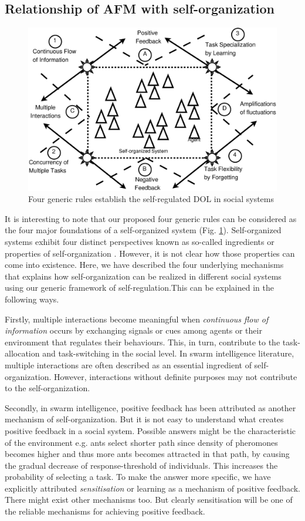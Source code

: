 \documentclass[final,5p,times,twocolumn]{elsarticle}
\begin{document}
\subsection{Relationship of AFM with self-organization}
\label{afm:so}
\begin{figure}
\centering
\includegraphics[width=0.7\linewidth, angle=0]
{./images/self-org-2.eps}
\caption{\small Four generic rules establish the self-regulated DOL in social systems}
\label{fig:afm-rules} %
\end{figure}

It is interesting to note that our proposed four generic rules can be considered as  the four major foundations of a self-organized system (Fig.  \ref{fig:afm-rules}). Self-organized systems exhibit four distinct perspectives known as so-called ingredients or properties of self-organization \cite{Camazine+2001}. However, it is not clear how those properties can come into existence. Here, we have described the four underlying mechanisms that explains how self-organization can be realized in different social systems using our generic framework of self-regulation.This can be explained in the following ways.

Firstly, multiple interactions become meaningful when {\em continuous flow of information} occurs  by exchanging signals or cues among agents or their environment  that regulates their behaviours. This, in turn, contribute to the task-allocation  and task-switching in the social level.  In swarm intelligence literature, multiple interactions are often described as an essential ingredient of self-organization. However, interactions without definite purposes may not contribute to the self-organization.

Secondly, in swarm intelligence, positive feedback has been attributed as another mechanism of  self-organization. But it is not easy to understand what creates positive feedback in a social system. Possible answers might be the characteristic of the environment e.g. ants select shorter path since density of pheromones becomes higher and thus more ants becomes attracted in that path, by causing the gradual decrease of response-threshold of individuals. This increases the probability of selecting a task.  To make the answer more specific, we have explicitly attributed {\em sensitisation} or learning as a mechanism of positive feedback. There might exist other mechanisms too. But clearly sensitisation will be one of the reliable mechanisms for achieving positive feedback.
\end{document}
